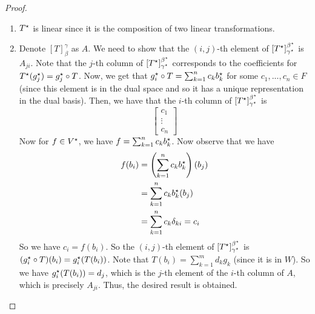 \documentclass[main.tex]{subfiles}
\begin{document}
    \begin{proof}
        \begin{enumerate}
            \item $T^{\star}$ is linear since it is the composition of two linear transformations.

            \item Denote $[T]_\beta^\gamma$ as $A$. We need to show that the $(i,j)$-th element of $[T^{\star}]_{\gamma^{\star}}^{\beta^{\star}}$ is $A_{ji}$. Note that the $j$-th column of $[T^{\star}]_{\gamma^{\star}}^{\beta^{\star}}$ corresponds to the coefficients for $T^{\star}(g_j^{\star}) = g_j^{\star} \circ T$. Now, we get that $g_i^{\star} \circ T = \sum_{k=1}^n c_kb_k^{\star}$ for some $c_1, ..., c_n\in F$ (since this element is in the dual space and so it has a unique representation in the dual basis). Then, we have that the $i$-th column of $[T^{\star}]_{\gamma^{\star}}^{\beta^{\star}}$ is 
            \begin{equation*}
                \begin{bmatrix}
                    c_1 \\ \vdots \\ c_n
                \end{bmatrix}
            \end{equation*}
            Now for $f\in V^{\star}$, we have $f = \sum_{k=1}^n c_kb_k^{\star}$. Now observe that we have 
            \begin{align*}
                f(b_i) &= \left( \sum_{k=1}^n c_kb_k^{\star} \right) (b_j) \\
                &= \sum_{k=1}^n c_kb_k^{\star} (b_j) \\
                &= \sum_{k=1}^n c_k \delta_{ki} = c_i
            \end{align*}
            So we have $c_i = f(b_i)$. So the $(i,j)$-th element of $[T^{\star}]_{\gamma^{\star}}^{\beta^{\star}}$ is $(g_i^{\star} \circ T)(b_i) = g_i^{\star}(T(b_i))$. Note that $T(b_i) = \sum_{k=1}^m d_kg_k$ (since it is in $W$). So we have $g_i^{\star} (T(b_i)) = d_j$, which is the $j$-th element of the $i$-th column of $A$, which is precisely $A_{ji}$. Thus, the desired result is obtained.
        \end{enumerate}
    \end{proof}
\end{document}
